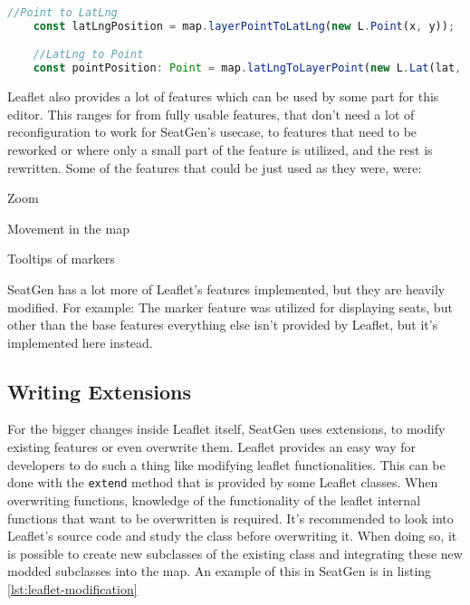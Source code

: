 \begin{lstlisting}[language=TypeScript, caption={Latitude Longitude and Point conversion}, label={lst:latlng-point}]
    //Point to LatLng
    const latLngPosition = map.layerPointToLatLng(new L.Point(x, y));

    //LatLng to Point
    const pointPosition: Point = map.latLngToLayerPoint(new L.Lat(lat, lng));
\end{lstlisting}

Leaflet also provides a lot of features which can be used by some part for this editor. This ranges for from fully usable features, that don't need a lot of reconfiguration to work for SeatGen's usecase, to features that need to be reworked or where only a small part of the feature is utilized, and the rest is rewritten. Some of the features that could be just used as they were, were:
\begin{compactitem}
\item Zoom
\item Movement in the map
\item Tooltips of markers
\end{compactitem} 

SeatGen has a lot more of Leaflet's features implemented, but they are heavily modified. For example: The marker feature was utilized for displaying seats, but other than the base features everything else isn't provided by Leaflet, but it's implemented here instead.

\subsection{Writing Extensions}
For the bigger changes inside Leaflet itself, SeatGen uses extensions, to modify existing features or even overwrite them. Leaflet provides an easy way for developers to do such a thing like modifying leaflet functionalities. This can be done with the \texttt{extend} method that is provided by some Leaflet classes. When overwriting functions, knowledge of the functionality of the leaflet internal functions that want to be overwritten is required. It's recommended to look into Leaflet's source code and study the class before overwriting it. When doing so, it is possible to create new subclasses of the existing class and integrating these new modded subclasses into the map. An example of this in SeatGen is in listing \ref{lst:leaflet-modification}

